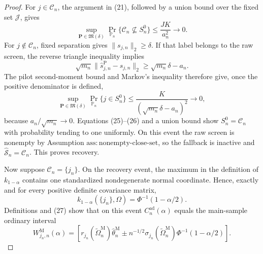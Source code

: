 \documentclass{article}
\begin{document}
\begin{proof}
For \(j\in\mathcal C_n\), the argument in (21), followed by a union bound over the fixed set \(\mathcal J\), gives
\[
 \sup_{\mathbf P\in\mathfrak M(\delta)}
 \Pr_{\mathbb P_n}\{\mathcal C_n\nsubseteq S_n^0\}
 \le \frac{JK}{a_n^2}\longrightarrow0.
\tag{25}
\]
For \(j\notin\mathcal C_n\), fixed separation gives \(\|s_{j,n}\|_2\ge\delta\).  If that label belongs to the raw screen, the reverse triangle inequality implies
\[
 \sqrt{m_n}\|\widehat s_{j,n}^{\mathrm P}-s_{j,n}\|_2
 \ge \sqrt{m_n}\delta-a_n.
\]
The pilot second-moment bound and Markov's inequality therefore give, once the positive denominator is defined,
\[
 \sup_{\mathbf P\in\mathfrak M(\delta)}
 \Pr_{\mathbb P_n}\{j\in S_n^0\}
 \le \frac K{(\sqrt{m_n}\delta-a_n)^2}\longrightarrow0,
\tag{26}
\]
because \(a_n/\sqrt{m_n}\to0\).  Equations (25)--(26) and a union bound show \(S_n^0=\mathcal C_n\) with probability tending to one uniformly.  On this event the raw screen is nonempty by Assumption \(\mathrm{ass:nonempty\text{-}close\text{-}set}\), so the fallback is inactive and \(\widehat{\mathcal S}_n=\mathcal C_n\).  This proves recovery.

Now suppose \(\mathcal C_n=\{j_n\}\).  On the recovery event, the maximum in the definition of \(k_{1-\alpha}\) contains one standardized nondegenerate normal coordinate.  Hence, exactly and for every positive definite covariance matrix,
\[
 k_{1-\alpha}(\{j_n\},\Omega)=\Phi^{-1}(1-\alpha/2).
\tag{27}
\]
Definitions and (27) show that on this event \(C_n^{\mathrm{ad}}(\alpha)\) equals the main-sample ordinary interval
\[
 W_{j_n,n}^{\mathrm M}(\alpha)
 =\left[
 r_{j_n}(\widetilde\Omega_n^{\mathrm M})\widehat\theta_n^{\mathrm M}
 \mathbin{\pm}n^{-1/2}\sigma_{j_n}(\widetilde\Omega_n^{\mathrm M})
 \Phi^{-1}(1-\alpha/2)
 \right].
\tag{28}
\]


\end{proof}
\end{document}
